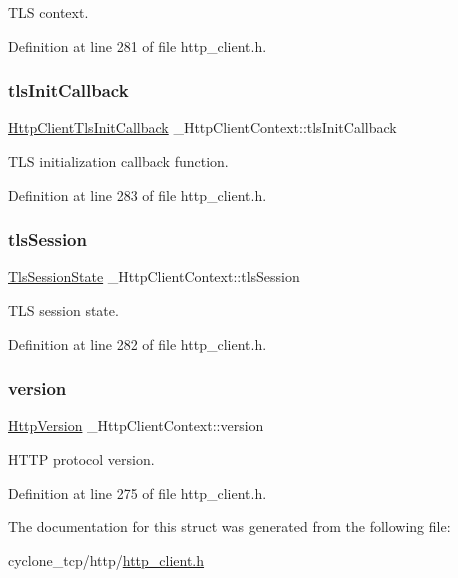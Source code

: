 T\+LS context. 



Definition at line 281 of file http\+\_\+client.\+h.

\mbox{\label{struct__HttpClientContext_aefc12f45bc5f1477bd521b6866a0b6d9}} 
\subsubsection{\texorpdfstring{tls\+Init\+Callback}{tlsInitCallback}}
{\footnotesize\ttfamily \hyperlink{http__client_8h_a7627ce7ef31eba950fa770eceb5a4cf2}{Http\+Client\+Tls\+Init\+Callback} \+\_\+\+Http\+Client\+Context\+::tls\+Init\+Callback}



T\+LS initialization callback function. 



Definition at line 283 of file http\+\_\+client.\+h.

\mbox{\label{struct__HttpClientContext_ae1e74e5f344a7f9a16e4194a5ebc8e65}} 
\subsubsection{\texorpdfstring{tls\+Session}{tlsSession}}
{\footnotesize\ttfamily \hyperlink{structTlsSessionState}{Tls\+Session\+State} \+\_\+\+Http\+Client\+Context\+::tls\+Session}



T\+LS session state. 



Definition at line 282 of file http\+\_\+client.\+h.

\mbox{\label{struct__HttpClientContext_a7b8619ae39d9b1b13ca1b4feef0c1441}} 
\subsubsection{\texorpdfstring{version}{version}}
{\footnotesize\ttfamily \hyperlink{http__common_8h_ac870fd261da652aee69937751c6f7e7f}{Http\+Version} \+\_\+\+Http\+Client\+Context\+::version}



H\+T\+TP protocol version. 



Definition at line 275 of file http\+\_\+client.\+h.



The documentation for this struct was generated from the following file\+:\begin{DoxyCompactItemize}
\item 
cyclone\+\_\+tcp/http/\hyperlink{http__client_8h}{http\+\_\+client.\+h}\end{DoxyCompactItemize}
